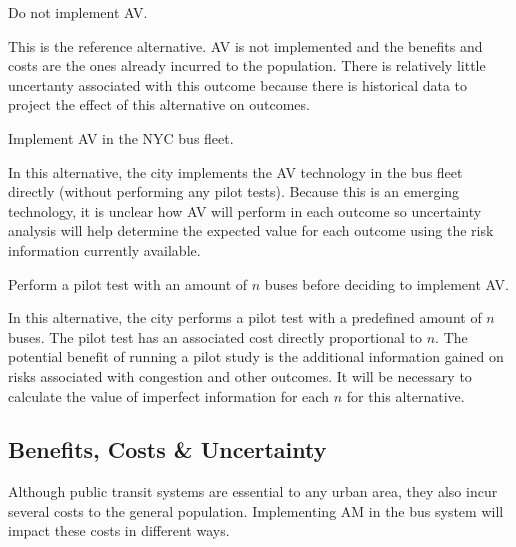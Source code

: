 \documentclass[11pt, letterpaper]{article}
\begin{document}
\begin{description}[leftmargin=0pt]
\item[Alternative 1:] Do not implement AV.

This is the reference alternative. AV is not implemented and the
benefits and costs are the ones already incurred to the population.
There is relatively little uncertanty associated with this outcome
because there is historical data to project the effect of this
alternative on outcomes.

\item[Alternative 2:] Implement AV in the NYC bus fleet.

In this alternative, the city implements the AV technology in the bus
fleet directly (without performing any pilot tests).  Because this is
an emerging technology, it is unclear how AV will perform in each
outcome so uncertainty analysis will help determine the expected value
for each outcome using the risk information currently available.

\item[Alternative 3:] Perform a pilot test with an amount of $n$ buses
  before deciding to implement AV.

In this alternative, the city performs a pilot test with a predefined
amount of $n$ buses. The pilot test has an associated cost directly
proportional to $n$.  The potential benefit of running a pilot study
is the additional information gained on risks associated with
congestion and other outcomes.  It will be necessary to calculate the
value of imperfect information for each $n$ for this alternative.

\end{description}

\subsection{Benefits, Costs \& Uncertainty}

Although public transit systems are essential to any urban area, they 
also incur several costs to the general population. Implementing AM 
in the bus system will impact these costs in different ways.
\end{document}
